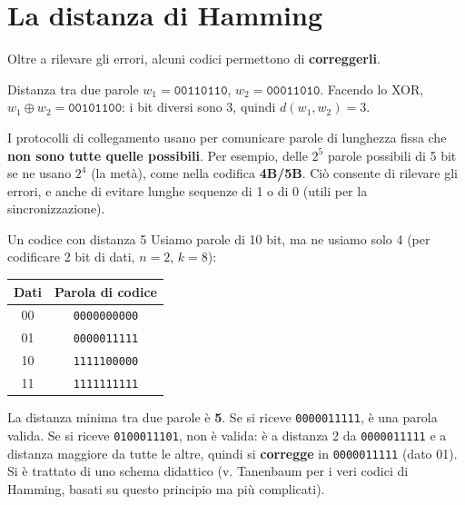 \section{La distanza di Hamming}

Oltre a rilevare gli errori, alcuni codici permettono di \textbf{correggerli}.


\begin{esempio}{Distanza tra due parole}
$w_1 = \texttt{00110110}$, $w_2 = \texttt{00011010}$. Facendo lo XOR,
$w_1 \oplus w_2 = \texttt{00101100}$: i bit diversi sono 3, quindi $d(w_1, w_2) = 3$.
\end{esempio}

I protocolli di collegamento usano per comunicare parole di lunghezza fissa che \textbf{non sono tutte quelle possibili}. Per esempio,
delle $2^5$ parole possibili di 5 bit se ne usano $2^4$ (la metà), come nella codifica \textbf{4B/5B}. Ciò consente di rilevare gli
errori, e anche di evitare lunghe sequenze di 1 o di 0 (utili per la sincronizzazione).

\begin{esempio}{Un codice con distanza 5}
Usiamo parole di 10 bit, ma ne usiamo solo 4 (per codificare 2 bit di dati, $n=2$, $k=8$):
\begin{center}
\begin{tabular}{cc}
\toprule
\textbf{Dati} & \textbf{Parola di codice} \\
\midrule
00 & \texttt{0000000000} \\
01 & \texttt{0000011111} \\
10 & \texttt{1111100000} \\
11 & \texttt{1111111111} \\
\bottomrule
\end{tabular}
\end{center}
La distanza minima tra due parole è \textbf{5}. Se si riceve \texttt{0000011111}, è una parola valida. Se si riceve
\texttt{0\textcolor{netred}{1}000111\textcolor{netred}{0}1}, non è valida: è a distanza 2 da \texttt{0000011111} e a distanza maggiore da tutte
le altre, quindi si \textbf{corregge} in \texttt{0000011111} (dato 01). Si è trattato di uno schema didattico (v. Tanenbaum per i veri
codici di Hamming, basati su questo principio ma più complicati).
\end{esempio}

